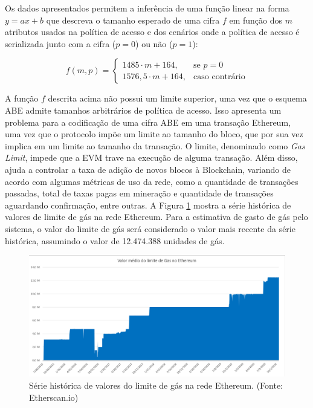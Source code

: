 \documentclass[a4paper,11pt]{article}
\begin{document}
Os dados apresentados permitem a inferência de uma função linear na forma $y = ax + b$ que descreva o tamanho esperado de uma cifra $f$ em função dos $m$ atributos usados na política de acesso e dos cenários onde a política de acesso é serializada junto com a cifra ($p = 0$) ou não ($p = 1$):

\begin{equation}
f(m, p) =
\left\{\begin{matrix}
    1485 \cdot m + 164, & \mbox{se }p = 0 \\
    1576{,}5 \cdot m + 164, & \mbox{caso contrário}
\end{matrix} \right.
\end{equation}


A função $f$ descrita acima não possui um limite superior, uma vez que o esquema ABE admite tamanhos arbitrários de política de acesso.
Isso apresenta um problema para a codificação de uma cifra ABE em uma transação Ethereum, uma vez que o protocolo impõe um limite ao tamanho do bloco, que por sua vez implica em um limite ao tamanho da transação.
O limite, denominado como \emph{Gas Limit}, impede que a EVM trave na execução de alguma transação. Além disso, ajuda a controlar a taxa de adição de novos blocos à Blockchain, variando de acordo com algumas métricas de uso da rede, como a quantidade de transações passadas, total de taxas pagas em mineração e quantidade de transações aguardando confirmação, entre outras.
A Figura \ref{fig:serie-gasLimit} mostra a série histórica de valores de limite de gás na rede Ethereum.
Para a estimativa de gasto de gás pelo sistema, o valor do limite de gás será considerado o valor mais recente da série histórica, assumindo o valor de 12.474.388 unidades de gás.

\begin{figure}[!h]
  \centering
  \includegraphics[width=\textwidth]{images/gasLimit.png}
  \caption{Série histórica de valores do limite de gás na rede Ethereum. (Fonte: Etherscan.io)}
  \label{fig:serie-gasLimit}
\end{figure}
\end{document}

